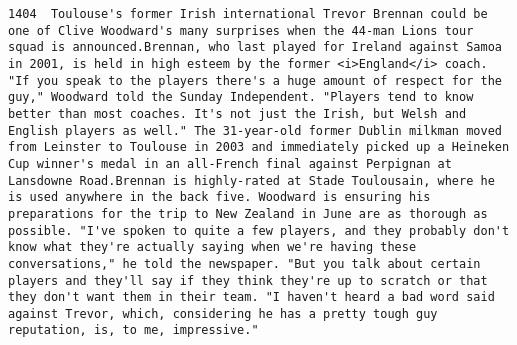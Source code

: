 \documentclass[11pt]{article}
\begin{document}
\begin{Verbatim}[commandchars=\\\{\}]
         1404  Toulouse's former Irish international Trevor Brennan could be one of Clive Woodward's many surprises when the 44-man Lions tour squad is announced.Brennan, who last played for Ireland against Samoa in 2001, is held in high esteem by the former <i>England</i> coach. "If you speak to the players there's a huge amount of respect for the guy," Woodward told the Sunday Independent. "Players tend to know better than most coaches. It's not just the Irish, but Welsh and English players as well." The 31-year-old former Dublin milkman moved from Leinster to Toulouse in 2003 and immediately picked up a Heineken Cup winner's medal in an all-French final against Perpignan at Lansdowne Road.Brennan is highly-rated at Stade Toulousain, where he is used anywhere in the back five. Woodward is ensuring his preparations for the trip to New Zealand in June are as thorough as possible. "I've spoken to quite a few players, and they probably don't know what they're actually saying when we're having these conversations," he told the newspaper. "But you talk about certain players and they'll say if they think they're up to scratch or that they don't want them in their team. "I haven't heard a bad word said against Trevor, which, considering he has a pretty tough guy reputation, is, to me, impressive."                                                                                                                                                                                                                                                                                                                                                                                                                                                                                                                                                                                                                                                                                                                                                                                                                                                                                                                                                                                                                                                                                                                                                                                                                                                                                                                                                                                                                                                                                                                                                                                                                                                                                                                                                                              

\end{Verbatim}
\end{document}
